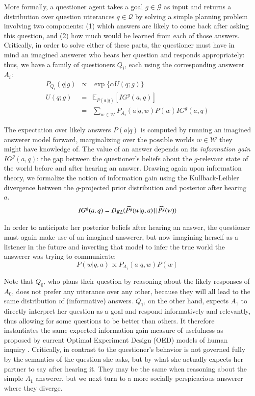 \documentclass[11pt, floatsintext]{apa6}
\newcommand{\KL}[2]{\ensuremath{D_{KL}({#1}\, \| \, {#2})}}
\newcommand{\E}[2]{\ensuremath{\mathbb{E}_{#1}\left [#2 \right]}}
\begin{document}
More formally, a questioner agent takes a goal $g \in \mathcal{G}$ as input and returns a distribution over question utterances $q \in \mathcal{Q}$ by solving a simple planning problem involving two components: (1) which answers are likely to come back after asking this question, and (2) how much would be learned from each of those answers. Critically, in order to solve either of these parts, the questioner must have in mind an imagined answerer who hears her question and responds appropriately: thus, we have a family of questioners $Q_i$, each using the corresponding answerer $A_i$:
%
$$
\begin{array}{lcl}
P_{Q_i}(q|g)  & \propto & \exp\{\alpha U(q;g)\} \\
U(q;g) & = & \E{P(a|q)}{IG^g(a,q)} \\
	 & = & \sum_{w\in\mathcal{W}} P_{A_i}(a|q,w)P(w) IG^g(a,q)
\end{array}
$$
%

The expectation over likely answers $P(a|q)$ is computed by running an imagined answerer model forward, marginalizing over the possible worlds $w \in\mathcal{W}$ they might have knowledge of. The value of an answer depends on its \emph{information gain} $IG^g(a,q)$: the gap between the questioner's beliefs about the $g$-relevant state of the world before and after hearing an answer. Drawing again upon information theory, we formalize the notion of information gain using the Kullback-Leibler divergence between the $g$-projected prior distribution and posterior after hearing $a$.
%
$$
IG^g(a,q) = \KL{\widehat{P^g}(w|q, a)}{\widehat{P^g}(w)}\\
$$
%

In order to anticipate her posterior beliefs after hearing an answer, the questioner must again make use of an imagined answerer, but now imagining herself as a listener in the future and inverting that model to infer the true world the answerer was trying to communicate:
$$P(w|q,a) \propto P_{A_i}(a| q, w)P(w)$$

Note that $Q_0$, who plans their question by reasoning about the likely responses of $A_0$, does not prefer any utterance over any other, because they will all lead to the same distribution of (informative) answers. $Q_1$, on the other hand, expects $A_1$ to directly interpret her question as a goal and respond informatively and relevantly, thus allowing for some questions to be better than others. It therefore instantiates the same expected information gain measure of usefulness as proposed by current Optimal Experiment Design (OED) models of human inquiry \cite{coenen2018asking}. Critically, in contrast to  the questioner's behavior is not governed fully by the semantics of the question she asks, but by what she actually expects her partner to say after hearing it. They may be the same when reasoning about the simple $A_1$ answerer, but we next turn to a more socially perspicacious answerer where they diverge.
\end{document}
